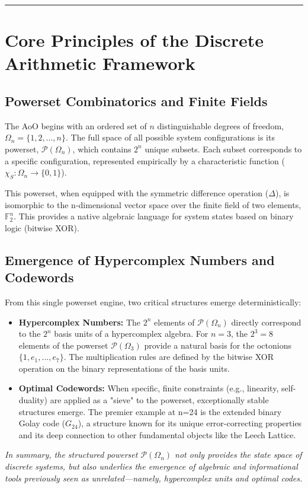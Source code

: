 \documentclass{article}
\theoremstyle{remark}
\begin{document}
\hrule
\section{Core Principles of the Discrete Arithmetic Framework}

\subsection{Powerset Combinatorics and Finite Fields}
The AoO begins with an ordered set of $n$ distinguishable degrees of freedom, $\Omega_n = \{1, 2, ..., n\}$. The full space of all possible system configurations is its powerset, $\mathcal{P}(\Omega_n)$, which contains $2^n$ unique subsets. Each subset corresponds to a specific configuration, represented empirically by a characteristic function ($\chi_S: \Omega_n \to \{0,1\}$).

This powerset, when equipped with the symmetric difference operation ($\Delta$), is isomorphic to the n-dimensional vector space over the finite field of two elements, $\mathbb{F}_2^n$. This provides a native algebraic language for system states based on binary logic (bitwise XOR).

\subsection{Emergence of Hypercomplex Numbers and Codewords}
From this single powerset engine, two critical structures emerge deterministically:
\begin{itemize}
    \item \textbf{Hypercomplex Numbers:} The $2^n$ elements of $\mathcal{P}(\Omega_n)$ directly correspond to the $2^n$ basis units of a hypercomplex algebra. For $n=3$, the $2^3 = 8$ elements of the powerset $\mathcal{P}(\Omega_3)$ provide a natural basis for the octonions $\{1, e_1, ..., e_7\}$. The multiplication rules are defined by the bitwise XOR operation on the binary representations of the basis units.
    \item \textbf{Optimal Codewords:} When specific, finite constraints (e.g., linearity, self-duality) are applied as a "sieve" to the powerset, exceptionally stable structures emerge. The premier example at n=24 is the extended binary Golay code ($G_{24}$), a structure known for its unique error-correcting properties and its deep connection to other fundamental objects like the Leech Lattice.
\end{itemize}
\emph{In summary, the structured powerset $\mathcal{P}(\Omega_n)$ not only provides the state space of discrete systems, but also underlies the emergence of algebraic and informational tools previously seen as unrelated—namely, hypercomplex units and optimal codes.}
\end{document}
